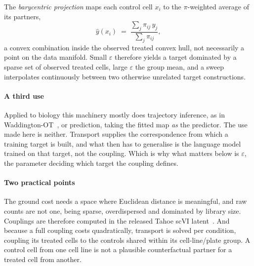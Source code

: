 The \emph{barycentric projection} maps each control cell $x_i$ to the
$\pi$-weighted average of its partners,
\begin{equation}
  \hat{y}(x_i) \;=\; \frac{\sum_j \pi_{ij}\, y_j}{\sum_j \pi_{ij}},
\end{equation}
a convex combination inside the observed treated convex hull, not necessarily a
point on the data manifold. Small $\varepsilon$ therefore yields a target
dominated by a sparse set of observed treated cells, large $\varepsilon$ the
group mean, and a sweep interpolates continuously between two otherwise unrelated
target constructions.

\paragraph{A third use} Applied to biology this machinery mostly does
trajectory inference, as in Wad\-ding\-ton-OT~\cite{schiebinger}, or prediction,
taking the fitted map \emph{as} the predictor. The use made here is neither.
Transport supplies the correspondence from which a training target is built, and
what then has to generalise is the language model trained on that target, not the
coupling. Which is why what matters below is $\varepsilon$, the parameter
deciding which target the coupling defines.

\paragraph{Two practical points} The ground cost needs a space where Euclidean
distance is meaningful, and raw counts are not one, being sparse, overdispersed
and dominated by library size. Couplings are therefore computed in the released
Tahoe scVI latent~\cite{scvi}. And because a full coupling costs quadratically,
transport is solved per condition, coupling its treated cells to the controls
shared within its cell-line/plate group. A control cell from one cell line is not
a plausible counterfactual partner for a treated cell from another.
